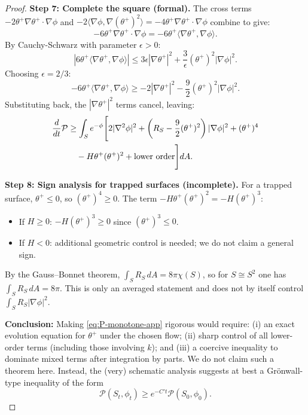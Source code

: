 \begin{proof}
\textbf{Step 7: Complete the square (formal).}
The cross terms $-2\theta^+\nabla\theta^+\cdot\nabla\phi$ and $-2\langle\nabla\phi, \nabla(\theta^+)^2\rangle = -4\theta^+\nabla\theta^+\cdot\nabla\phi$ combine to give:
\begin{equation}
-6\theta^+\nabla\theta^+\cdot\nabla\phi = -6\theta^+\langle\nabla\theta^+, \nabla\phi\rangle.
\end{equation}
By Cauchy-Schwarz with parameter $\epsilon > 0$:
\begin{equation}
\left|6\theta^+\langle\nabla\theta^+, \nabla\phi\rangle\right| \leq 3\epsilon|\nabla\theta^+|^2 + \frac{3}{\epsilon}(\theta^+)^2|\nabla\phi|^2.
\end{equation}
Choosing $\epsilon = 2/3$:
\begin{equation}
-6\theta^+\langle\nabla\theta^+, \nabla\phi\rangle \geq -2|\nabla\theta^+|^2 - \frac{9}{2}(\theta^+)^2|\nabla\phi|^2.
\end{equation}
Substituting back, the $|\nabla\theta^+|^2$ terms cancel, leaving:
\begin{align}
\frac{d}{dt}\mathcal{P} &\geq \int_S e^{-\phi}\Bigg[2|\nabla^2\phi|^2 + \left(R_S - \frac{9}{2}(\theta^+)^2\right)|\nabla\phi|^2 + (\theta^+)^4 \notag\\
&\quad - H\theta^+(\theta^+)^2 + \text{lower order}\Bigg]dA.
\end{align}

\textbf{Step 8: Sign analysis for trapped surfaces (incomplete).}
For a trapped surface, $\theta^+ \leq 0$, so $(\theta^+)^4 \geq 0$. The term $-H\theta^+(\theta^+)^2 = -H(\theta^+)^3$:
\begin{itemize}
\item If $H \geq 0$: $-H(\theta^+)^3 \geq 0$ since $(\theta^+)^3 \leq 0$.
\item If $H < 0$: additional geometric control is needed; we do not claim a general sign.
\end{itemize}

By the Gauss--Bonnet theorem, $\int_S R_S \, dA = 8\pi\chi(S)$, so for $S\cong S^2$ one has $\int_S R_S\,dA=8\pi$. This is only an averaged statement and does not by itself control $\int_S R_S|\nabla\phi|^2$.

\textbf{Conclusion:} Making \eqref{eq:P-monotone-app} rigorous would require: (i) an exact evolution equation for $\theta^+$ under the chosen flow; (ii) sharp control of all lower-order terms (including those involving $k$); and (iii) a coercive inequality to dominate mixed terms after integration by parts. We do not claim such a theorem here. Instead, the (very) schematic analysis suggests at best a Gr\"onwall-type inequality of the form
\begin{equation}
\mathcal{P}(S_t, \phi_t) \geq e^{-C't}\mathcal{P}(S_0, \phi_0).
\end{equation}


\end{proof}
